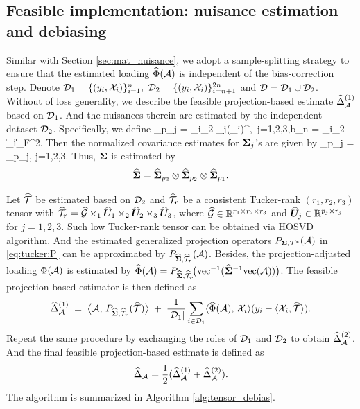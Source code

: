 \documentclass[authoryear,preprint,review,12pt]{elsarticle}
\begin{document}
	
	\subsection{Feasible implementation: nuisance estimation and debiasing}\label{sec:feasible}
	Similar with Section \ref{sec:mat_nuisance}, we adopt a sample-splitting strategy to ensure that the estimated loading $\widehat\Phi(\mathcal{A})$ is independent of the
	bias-correction step. Denote $\mathcal{D}_1 = \{ (y_i, \mathcal{X}_i)\}_{i=1}^n,\ \mathcal{D}_2 = \{ (y_i, \mathcal{X}_i)\}_{i=n+1}^{2n}$ and $\mathcal{D} = \mathcal{D}_1\cup\mathcal{D}_2$. 
	Without of loss generality, we describe the feasible projection-based estimate $\widehat\Delta_{\mathcal{A}}^{(1)}$ based on $\mathcal{D}_1$. And the nuisances therein are estimated by the independent dataset $\mathcal{D}_2$. 
	Specifically, we define 
	\be\label{eq:cov3}\wt\bSigma_{p_j} = \sum_{i\in\mD_2}  _j(\mX_i)^{},\ j=1,2,3,\quad b_n =  \sum_{i\in\mD_2} \|\mX_i\|_F^2. \ee
	Then the normalized covariance estimates for $\mathbf{ \Sigma}_j$'s are given by
	\be\label{eq:cov4}\wh\bSigma_{p_j} = \wt\bSigma_{p_j}, \quad j=1,2,3.\ee
	Thus, $	\mathbf{ \Sigma}$ is estimated by
	\begin{equation}
		\widehat{\mathbf{ \Sigma}} = \widehat{\mathbf{ \Sigma}}_{p_3} \otimes \widehat{\mathbf{ \Sigma}}_{p_2} \otimes \widehat{\mathbf{ \Sigma}}_{p_1}.
		\label{eq:deign_tensor}
	\end{equation}
	
	Let $\widehat{\mathcal{T}}$ be estimated based on $\mathcal{D}_2$ and $\widehat{\mathcal{T}}_{\boldsymbol r}$ be a consistent Tucker-rank $(r_1, r_2, r_3)$ tensor with $\widehat{\mathcal{T}}_{\boldsymbol r} = \widehat{\mathcal G}\times_1 \widehat{\boldsymbol U}_1 \times_2 \widehat{\boldsymbol U}_2  \times_3 \widehat{\boldsymbol U}_3$, where $\widehat{\mathcal G}\in\mathbb{R}^{r_1\times r_2\times r_3}$ and $\widehat{\boldsymbol U}_j\in\mathbb{R}^{p_j\times r_j}$ for $j=1,2,3$.  Such low Tucker-rank tensor can be obtained via HOSVD algorithm. 
	And the estimated generalized projection operators $P_{\mathbf{ \Sigma},\mathcal{T}^\ast}(\mathcal{A})$ in \eqref{eq:tucker:P} can be approximated by $P_{\widehat{\mathbf{ \Sigma}}, \widehat{\mathcal{T}}_{\boldsymbol r}}(\mathcal{A})$. Besides,  the projection-adjusted loading $\Phi(\mathcal{A})$ is estimated by $\widehat \Phi(\mathcal{A}) = P_{\widehat{\mathbf{ \Sigma}}, \widehat{\mathcal{T}}_{\boldsymbol r}}\!\bigl(\mathrm{vec}^{-1}(\widehat {\mathbf{ \Sigma}}^{-1}\mathrm{vec}(\mathcal{A}))\bigr)$. The feasible projection-based estimator is then defined as
	\begin{equation}
		\widehat{\Delta}^{(1)}_{\mathcal{A}}
		\;=\;
		\bigl\langle \mathcal{A},\, P_{\widehat{\mathbf{ \Sigma}}, \widehat{\mathcal{T}}_{\boldsymbol r}}(\widehat{\mathcal{T}}) \bigr\rangle
		\;+\;
		\frac{1}{|\mathcal{D}_1|}\sum_{i\in \mathcal{D}_1}
		\langle \widehat\Phi(\mathcal{A}),\, \mathcal{X}_i \rangle
		(y_i-\langle \mathcal{X}_i, \widehat{\mathcal{T}}\rangle).
		\label{eq:tensor_feasible}
	\end{equation} 
	Repeat the same procedure by exchanging the roles of $\mathcal{D}_1$ and $\mathcal{D}_2$ to obtain $\widehat{\Delta}^{(2)}_{\mathcal{A}}$. And the final feasible projection-based estimate is defined as
	\begin{equation}
		\widehat{\Delta}_{\mathcal{A}} = \frac{1}{2} ( \widehat{\Delta}_{\mathcal{A}}^{(1)} + \widehat{\Delta}_{\mathcal{A}}^{(2)}).
		\label{eq:final_tensor}
	\end{equation}
	The algorithm is summarized in Algorithm \ref{alg:tensor_debias}.
	
\end{document}
